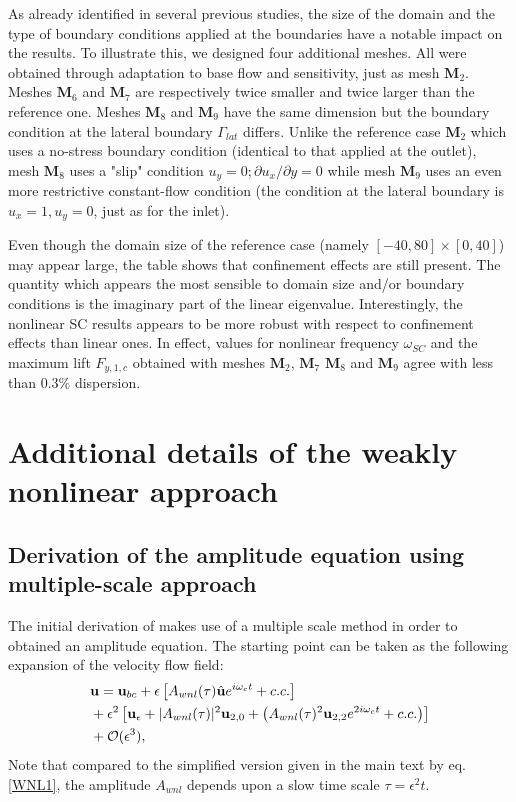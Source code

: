 \documentclass[twocolumn,10pt]{asme2ej}
\newcommand{\be}[1]{ \begin{equation} \label{#1}}
\newcommand{\ee}{\end{equation}}
\begin{document}
As already identified in several previous studies, the size of the domain and the type of boundary conditions applied at the boundaries have a notable impact on the results. To illustrate this, we designed four additional meshes. All were obtained through adaptation to base flow and sensitivity, just as mesh $\mathbf{M}_2$.
Meshes $\mathbf{M}_6$ and $\mathbf{M}_7$ are respectively twice smaller and twice larger than the reference one. 
Meshes $\mathbf{M}_8$ and $\mathbf{M}_9$ have the same dimension but the boundary condition at the lateral boundary
 $\Gamma_{lat}$ differs. Unlike the reference case $\mathbf{M}_2$ which uses a no-stress boundary condition (identical to that applied at the outlet), mesh $\mathbf{M}_8$ uses a "slip" condition $u_y = 0 ; \partial u_x/\partial y = 0$ while mesh $\mathbf{M}_9$ uses an even more restrictive constant-flow condition (the condition at the lateral boundary is $u_x = 1, u_y = 0$, just as for the inlet).
 
Even though the domain size of the reference case (namely $[-40,80]\times[0,40]$) may appear large, the table shows that confinement effects are still present. The quantity which appears the most sensible to domain size and/or boundary conditions is the imaginary part of the linear eigenvalue. Interestingly, the nonlinear SC results appears to be more robust with respect to confinement effects than linear ones. 
In effect, values for nonlinear frequency $\omega_{SC}$ and the maximum lift $F_{y,1,c}$ obtained with meshes  $\mathbf{M}_2$, $\mathbf{M}_7$ $\mathbf{M}_8$ and $\mathbf{M}_9$ agree with less than $0.3\%$ dispersion.





\section{Additional details of the weakly nonlinear approach}

\subsection{Derivation of the amplitude equation using multiple-scale approach}

The initial derivation of \cite{SippLebedev} makes use of a multiple scale method in order to obtained an amplitude equation.
The starting point can be taken as the following expansion of the velocity flow field:
\be{WNL2}
\begin{aligned}
&{\bf u} = {}  {\bf u}_{bc} + \epsilon \left[ A_{wnl}(\tau)  \hat{\bf u} e^{i \omega_c t} + c.c. \right]\\
&+ \epsilon^2 \left[ {\bf u}_\epsilon + |A_{wnl}(\tau) |^2  {\bf u}_{2,0} + \left(  A_{wnl}(\tau) ^2 {\bf u}_{2,2} e^{2 i \omega_c t} + c.c. \right) \right]\\
& + {\cal O}( \epsilon ^3),
\end{aligned}
\ee
Note that compared to the simplified version given in the main text by eq. \ref{WNL1}, the amplitude $A_{wnl}$ depends upon a slow time scale 
$\tau = \epsilon^2 t$.
\end{document}
